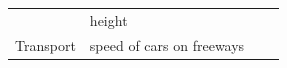 {\begin{center}
\begin{xtabular*}{\mytablewidth}[t]{|p{10\mystarwidth}|p{10\mystarwidth}|p{10\mystarwidth}|p{10\mystarwidth}|}
    
         &
    
    
        height &
    
    
         &
    
    
     \tabularnewline{}
    
    
        Transport &
    
    
        speed of cars on freeways &
    
    
         &
    
    
     \tabularnewline{}
    

\end{xtabular*}
\end{center}}
